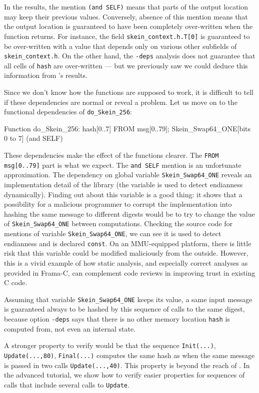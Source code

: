 \documentclass{frama-c-book}
\begin{document}
In the results, the mention \verb|(and SELF)| means that parts of the output
location may keep their previous values. Conversely, absence of this
mention means that the output location is guaranteed to have been completely
over-written when the function returns.
For instance, the field \lstinline|skein_context.h.T[0]| is
guaranteed to be over-written with a value that depends only on
various other subfields of \lstinline|skein_context.h|. On the other
hand, the \verb|-deps| analysis does not guarantee that all cells of
\verb|hash| are over-written --- but we previously saw we
could deduce this information from \Eva{}'s results.

Since we don't know how the functions are supposed to work,
it is difficult to tell if these
dependencies are normal or reveal a problem. Let us move on to the
functional dependencies of \lstinline|do_Skein_256|:
\begin{logsmath}
Function do_Skein_256:
  hash[0..7] FROM msg[0..79]; Skein_Swap64_ONE[bits 0 to 7] (and SELF)
\end{logsmath}

These dependencies make the effect of the functions clearer.  The
\verb|FROM msg[0..79]| part is what we expect.  The
\verb|and SELF| mention is an unfortunate approximation.  The
dependency on global variable \verb|Skein_Swap64_ONE| reveals an implementation
detail of the library (the variable is used to detect endianness
dynamically). Finding out about this variable is a good thing: it
shows that a possibility for a malicious programmer to corrupt the
implementation into hashing the same message to different digests
would be to try to change the value of \verb|Skein_Swap64_ONE| between
computations.  Checking the source code for mentions of variable
\lstinline|Skein_Swap64_ONE|, we can see it is used to
detect endianness and is declared \lstinline|const|. On an
MMU-equipped platform, there is little risk that this variable
could be modified maliciously from the outside.
However, this is a vivid example of how static
analysis, and especially correct analyses as provided in Frama-C, can
complement code reviews in improving trust in existing C code.

Assuming that variable \lstinline|Skein_Swap64_ONE| keeps its value, a same
input message is guaranteed always to be hashed by this
sequence of calls to the same digest,
because option \verb|-deps| says that there is no other
memory location \lstinline|hash| is computed from, not even an
internal state.

A stronger property to verify would be that the
sequence \lstinline|Init(...)|, \lstinline|Update(...,80)|,
\lstinline|Final(...)| computes the same hash as when the
same message is passed in two calls \lstinline|Update(...,40)|.
This property is beyond the reach of \Eva{}.
In the advanced tutorial, we show how to verify easier properties
for sequences of calls that include several calls
to \lstinline|Update|.
\end{document}
